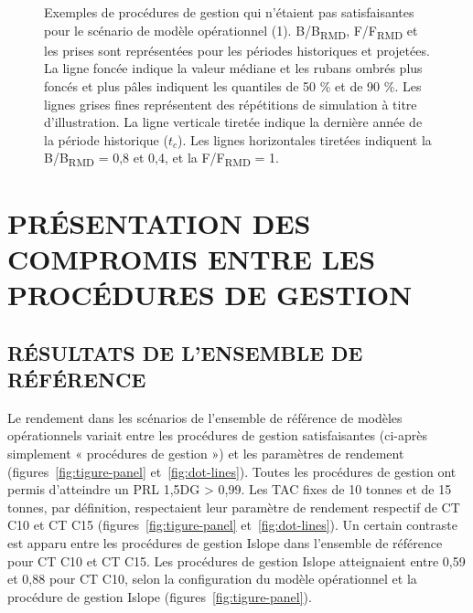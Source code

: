 \documentclass[french,11pt]{book}
\begin{document}
\begin{figure}[htb]

{\centering {} 

}

\caption{Exemples de procédures de gestion qui n'étaient pas satisfaisantes pour le scénario de modèle opérationnel (1). B/B\textsubscript{RMD}, F/F\textsubscript{RMD} et les prises sont représentées pour les périodes historiques et projetées. La ligne foncée indique la valeur médiane et les rubans ombrés plus foncés et plus pâles indiquent les quantiles de 50 \% et de 90 \%. Les lignes grises fines représentent des répétitions de simulation à titre d'illustration. La ligne verticale tiretée indique la dernière année de la période historique (\(t_c\)). Les lignes horizontales tiretées indiquent la B/B\textsubscript{RMD} = 0,8 et 0,4, et la F/F\textsubscript{RMD} = 1.}\label{fig:proj-not-satisficed-eg}
\end{figure}
\clearpage

\hypertarget{sec:results}{%
\section{PRÉSENTATION DES COMPROMIS ENTRE LES PROCÉDURES DE GESTION}\label{sec:results}}

\hypertarget{ruxe9sultats-de-lensemble-de-ruxe9fuxe9rence}{%
\subsection{RÉSULTATS DE L'ENSEMBLE DE RÉFÉRENCE}\label{ruxe9sultats-de-lensemble-de-ruxe9fuxe9rence}}

Le rendement dans les scénarios de l'ensemble de référence de modèles opérationnels variait entre les procédures de gestion satisfaisantes (ci-après simplement « procédures de gestion ») et les paramètres de rendement (figures~\ref{fig:tigure-panel} et~\ref{fig:dot-lines}). Toutes les procédures de gestion ont permis d'atteindre un PRL 1,5DG \textgreater{} 0,99. Les TAC fixes de 10 tonnes et de 15 tonnes, par définition, respectaient leur paramètre de rendement respectif de CT C10 et CT C15 (figures~\ref{fig:tigure-panel} et~\ref{fig:dot-lines}). Un certain contraste est apparu entre les procédures de gestion Islope dans l'ensemble de référence pour CT C10 et CT C15. Les procédures de gestion Islope atteignaient entre 0,59 et 0,88 pour CT C10, selon la configuration du modèle opérationnel et la procédure de gestion Islope (figures~\ref{fig:tigure-panel}).
\end{document}
